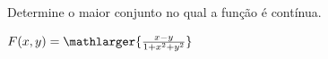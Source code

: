 
Determine o maior conjunto no qual a função é contínua.

\item $ F(x,y)=\mathlarger{\frac{x-y}{1+x^2+y^2}}$